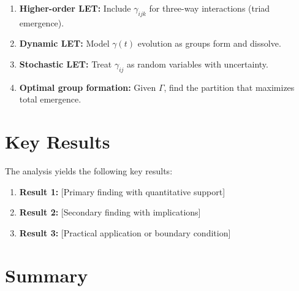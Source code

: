 \begin{enumerate}
\item \textbf{Higher-order LET:} Include $\gamma_{ijk}$ for three-way
interactions (triad emergence).

\item \textbf{Dynamic LET:} Model $\gamma(t)$ evolution as groups form
and dissolve.

\item \textbf{Stochastic LET:} Treat $\gamma_{ij}$ as random variables
with uncertainty.

\item \textbf{Optimal group formation:} Given $\Gamma$, find the
partition that maximizes total emergence.
\end{enumerate}



\section{Key Results}
\label{sec:let-results}

The analysis yields the following key results:

\begin{enumerate}
    \item \textbf{Result 1:} [Primary finding with quantitative support]
    \item \textbf{Result 2:} [Secondary finding with implications]
    \item \textbf{Result 3:} [Practical application or boundary condition]
\end{enumerate}


\section{Summary}
\label{sec:let-summary}

